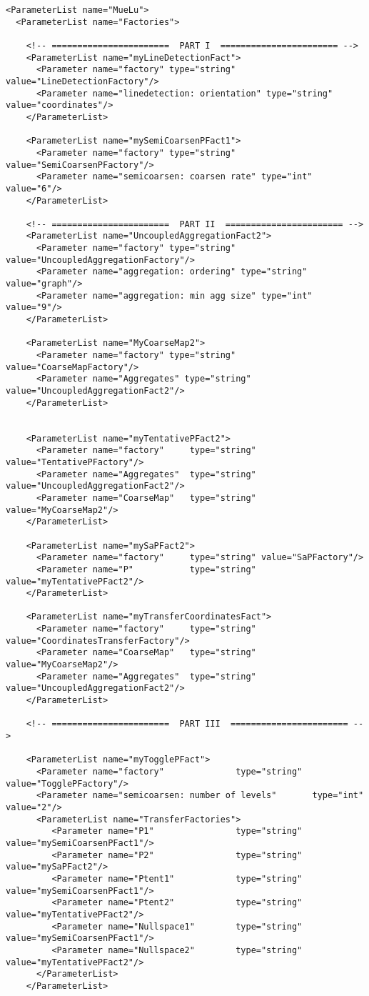\documentclass[10pt,fleqn]{book}
\begin{document}
\begin{lstlisting}
<ParameterList name="MueLu">
  <ParameterList name="Factories">

    <!-- =======================  PART I  ======================= -->
    <ParameterList name="myLineDetectionFact">
      <Parameter name="factory" type="string" value="LineDetectionFactory"/>
      <Parameter name="linedetection: orientation" type="string" value="coordinates"/>
    </ParameterList>

    <ParameterList name="mySemiCoarsenPFact1">
      <Parameter name="factory" type="string" value="SemiCoarsenPFactory"/>
      <Parameter name="semicoarsen: coarsen rate" type="int" value="6"/>
    </ParameterList>

    <!-- =======================  PART II  ======================= -->
    <ParameterList name="UncoupledAggregationFact2">
      <Parameter name="factory" type="string" value="UncoupledAggregationFactory"/>
      <Parameter name="aggregation: ordering" type="string" value="graph"/>
      <Parameter name="aggregation: min agg size" type="int"    value="9"/>
    </ParameterList>

    <ParameterList name="MyCoarseMap2">
      <Parameter name="factory" type="string" value="CoarseMapFactory"/>
      <Parameter name="Aggregates" type="string" value="UncoupledAggregationFact2"/>
    </ParameterList>


    <ParameterList name="myTentativePFact2">
      <Parameter name="factory"     type="string" value="TentativePFactory"/>
      <Parameter name="Aggregates"  type="string" value="UncoupledAggregationFact2"/>
      <Parameter name="CoarseMap"   type="string" value="MyCoarseMap2"/>
    </ParameterList>

    <ParameterList name="mySaPFact2">
      <Parameter name="factory"     type="string" value="SaPFactory"/>
      <Parameter name="P"           type="string" value="myTentativePFact2"/>
    </ParameterList>

    <ParameterList name="myTransferCoordinatesFact">
      <Parameter name="factory"     type="string" value="CoordinatesTransferFactory"/>
      <Parameter name="CoarseMap"   type="string" value="MyCoarseMap2"/>
      <Parameter name="Aggregates"  type="string" value="UncoupledAggregationFact2"/>
    </ParameterList>

    <!-- =======================  PART III  ======================= -->

    <ParameterList name="myTogglePFact">
      <Parameter name="factory"              type="string" value="TogglePFactory"/>
      <Parameter name="semicoarsen: number of levels"       type="int" value="2"/>
      <ParameterList name="TransferFactories">
         <Parameter name="P1"                type="string" value="mySemiCoarsenPFact1"/>
         <Parameter name="P2"                type="string" value="mySaPFact2"/>
         <Parameter name="Ptent1"            type="string" value="mySemiCoarsenPFact1"/>
         <Parameter name="Ptent2"            type="string" value="myTentativePFact2"/>
         <Parameter name="Nullspace1"        type="string" value="mySemiCoarsenPFact1"/>
         <Parameter name="Nullspace2"        type="string" value="myTentativePFact2"/>
      </ParameterList>
    </ParameterList>


\end{lstlisting}
\end{document}
